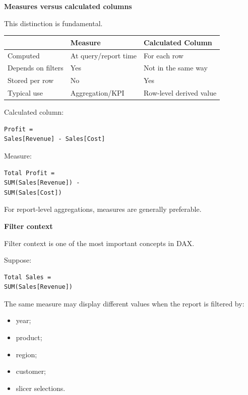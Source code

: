 \documentclass[11pt,letterpaper]{article}
\begin{document}
\textbf{Measures versus calculated columns}

This distinction is fundamental.

\begin{center}
\begin{tabularx}{\textwidth}{lXX}
\toprule
 & Measure & Calculated Column \\
\midrule
Computed & At query/report time & For each row \\
Depends on filters & Yes & Not in the same way \\
Stored per row & No & Yes \\
Typical use & Aggregation/KPI & Row-level derived value \\
\bottomrule
\end{tabularx}
\end{center}

Calculated column:

\begin{lstlisting}
Profit =
Sales[Revenue] - Sales[Cost]
\end{lstlisting}

Measure:

\begin{lstlisting}
Total Profit =
SUM(Sales[Revenue]) -
SUM(Sales[Cost])
\end{lstlisting}

For report-level aggregations, measures are generally preferable.



\textbf{Filter context}

Filter context is one of the most important concepts in DAX.

Suppose:

\begin{lstlisting}
Total Sales =
SUM(Sales[Revenue])
\end{lstlisting}

The same measure may display different values when the report is filtered by:

\begin{itemize}[leftmargin=*]
    \item year;
    \item product;
    \item region;
    \item customer;
    \item slicer selections.
\end{itemize}
\end{document}
